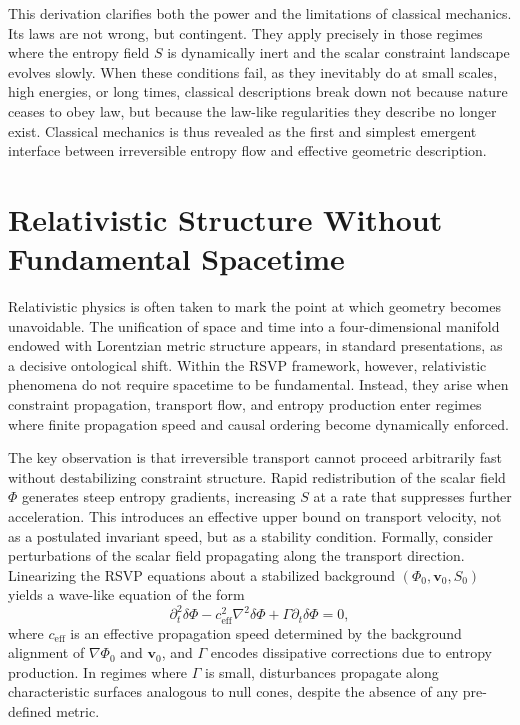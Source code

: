 \documentclass[11pt]{article}
\begin{document}
This derivation clarifies both the power and the limitations of classical mechanics. Its laws are not wrong, but contingent. They apply precisely in those regimes where the entropy field $S$ is dynamically inert and the scalar constraint landscape evolves slowly. When these conditions fail, as they inevitably do at small scales, high energies, or long times, classical descriptions break down not because nature ceases to obey law, but because the law-like regularities they describe no longer exist. Classical mechanics is thus revealed as the first and simplest emergent interface between irreversible entropy flow and effective geometric description.

\section{Relativistic Structure Without Fundamental Spacetime}

Relativistic physics is often taken to mark the point at which geometry becomes unavoidable. The unification of space and time into a four-dimensional manifold endowed with Lorentzian metric structure appears, in standard presentations, as a decisive ontological shift. Within the RSVP framework, however, relativistic phenomena do not require spacetime to be fundamental. Instead, they arise when constraint propagation, transport flow, and entropy production enter regimes where finite propagation speed and causal ordering become dynamically enforced.

The key observation is that irreversible transport cannot proceed arbitrarily fast without destabilizing constraint structure. Rapid redistribution of the scalar field $\Phi$ generates steep entropy gradients, increasing $S$ at a rate that suppresses further acceleration. This introduces an effective upper bound on transport velocity, not as a postulated invariant speed, but as a stability condition. Formally, consider perturbations of the scalar field propagating along the transport direction. Linearizing the RSVP equations about a stabilized background $(\Phi_0, \mathbf{v}_0, S_0)$ yields a wave-like equation of the form
\begin{equation}
\partial_t^2 \delta \Phi - c_{\text{eff}}^2 \nabla^2 \delta \Phi + \Gamma \partial_t \delta \Phi = 0,
\end{equation}
where $c_{\text{eff}}$ is an effective propagation speed determined by the background alignment of $\nabla \Phi_0$ and $\mathbf{v}_0$, and $\Gamma$ encodes dissipative corrections due to entropy production. In regimes where $\Gamma$ is small, disturbances propagate along characteristic surfaces analogous to null cones, despite the absence of any pre-defined metric.
\end{document}
